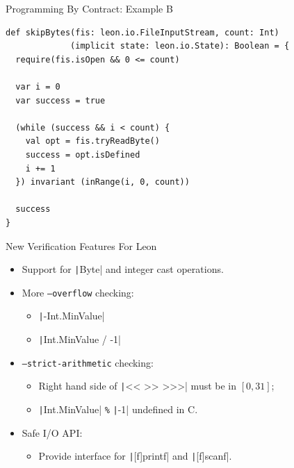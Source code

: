 \documentclass[xcolor={usenames,dvipsnames}]{beamer}
\newcommand{\Inline}[1]{\texttt{#1}}
\newcommand{\InlineC}[1]{\texttt|#1|}
\newcommand{\InlineS}[1]{\texttt|#1|}
\begin{document}
\begin{frame}[fragile]{Programming By Contract: Example B}


  \begin{verbatim}
def skipBytes(fis: leon.io.FileInputStream, count: Int)
             (implicit state: leon.io.State): Boolean = {
  require(fis.isOpen && 0 <= count)

  var i = 0
  var success = true

  (while (success && i < count) {
    val opt = fis.tryReadByte()
    success = opt.isDefined
    i += 1
  }) invariant (inRange(i, 0, count))

  success
}
  \end{verbatim}

\end{frame}


\begin{frame}[fragile]{New Verification Features For Leon}

  \begin{itemize}
    \item Support for \InlineS{Byte} and integer cast operations.
    \item More \Inline{--overflow} checking:
      \begin{itemize}
        \item \InlineS{-Int.MinValue}
        \item \InlineS{Int.MinValue / -1}
      \end{itemize}
    \item \Inline{--strict-arithmetic} checking:
      \begin{itemize}
        \item Right hand side of \InlineS{<< >> >>>} must be in $[0, 31]$;
        \item \InlineS{Int.MinValue} \texttt{\%} \InlineS{-1} undefined in C.
      \end{itemize}
    \item Safe I/O API:
      \begin{itemize}
        \item Provide interface for \InlineC{[f]printf} and \InlineC{[f]scanf}.
      \end{itemize}
  \end{itemize}

\end{frame}
\end{document}

